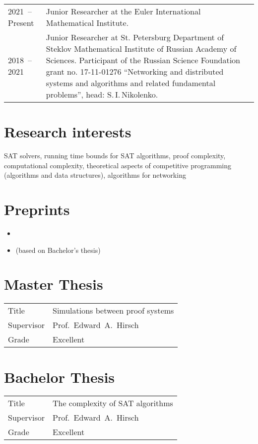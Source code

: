 \documentclass[a4paper, 11pt]{article}
\begin{document}
\begin{tabularx}{\textwidth}{lX}
	2021~-- Present & Junior Researcher at the Euler International
	Mathematical Institute.
	\\
	2018~-- 2021 & Junior Researcher at St. Petersburg Department of Steklov Mathematical Institute of Russian Academy of Sciences. Participant of the Russian Science Foundation grant no. 17-11-01276 ``Networking and distributed systems and algorithms and related fundamental problems'', head: S.\,I.\,Nikolenko.
	\\
\end{tabularx}


\section*{Research interests}

SAT solvers, running time bounds for SAT algorithms, proof complexity, computational complexity, theoretical aspects of competitive programming (algorithms and data structures), algorithms for networking

\section*{Preprints}

\begin{itemize}
	\item {}
	\item {} (based on Bachelor's thesis)
\end{itemize}

\section*{Master Thesis}

\begin{tabularx}{\textwidth}{lX}
	Title & Simulations between proof systems \\
	Supervisor & Prof.~Edward~A.~Hirsch \\
	Grade & Excellent
\end{tabularx}

\section*{Bachelor Thesis}

\begin{tabularx}{\textwidth}{lX}
	Title & The complexity of SAT algorithms \\
	Supervisor & Prof.~Edward~A.~Hirsch \\
	Grade & Excellent
\end{tabularx}
\end{document}
